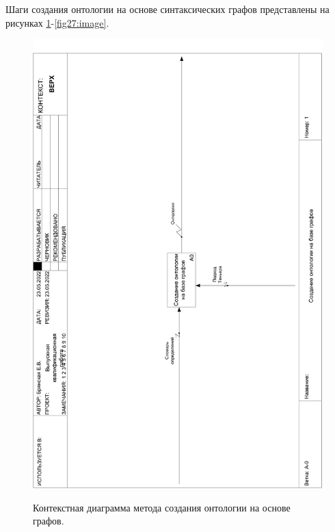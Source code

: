 Шаги создания онтологии на основе синтаксических графов представлены на рисунках \ref{fig25:image}-\ref{fig27:image}.
\begin{figure}[h]
	\begin{center}
		{\includegraphics[scale = 0.39, angle=-90, page=1]{img/idef0/pdf/ontologyTree.pdf}}
		\caption{Контекстная диаграмма метода создания онтологии на основе графов.}
		\label{fig25:image}
	\end{center}
\end{figure}

